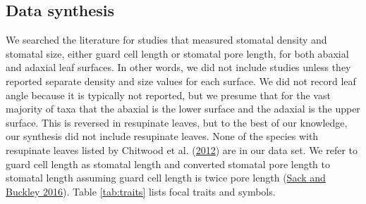 \documentclass[
  12pt,
]{article}
\begin{document}
\hypertarget{data-synthesis}{%
\subsection{Data synthesis}\label{data-synthesis}}

We searched the literature for studies that measured stomatal density and stomatal size, either guard cell length or stomatal pore length, for both abaxial and adaxial leaf surfaces. In other words, we did not include studies unless they reported separate density and size values for each surface. We did not record leaf angle because it is typically not reported, but we presume that for the vast majority of taxa that the abaxial is the lower surface and the adaxial is the upper surface. This is reversed in resupinate leaves, but to the best of our knowledge, our synthesis did not include resupinate leaves. None of the species with resupinate leaves listed by Chitwood et al. (\protect\hyperlink{ref-chitwood_conflict_2012}{2012}) are in our data set. We refer to guard cell length as stomatal length and converted stomatal pore length to stomatal length assuming guard cell length is twice pore length (\protect\hyperlink{ref-sack_developmental_2016}{Sack and Buckley 2016}). Table \ref{tab:traits} lists focal traits and symbols.
\end{document}
